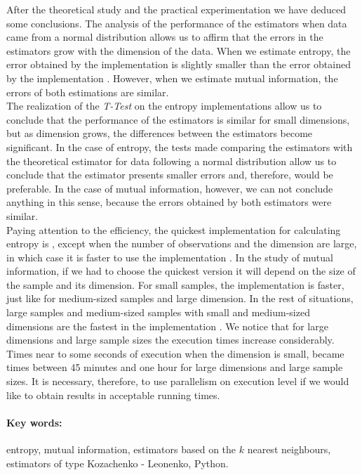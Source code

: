 After the theoretical study and the practical experimentation we have deduced some conclusions. The analysis of the performance of the estimators when data came from a normal distribution allows us to affirm that the errors in the estimators grow with the dimension of the data. When we estimate entropy, the error obtained by the implementation \cite{estimating} is slightly smaller than the error obtained by the implementation \cite{npeet}. However, when we estimate mutual information, the errors of both estimations are similar.\\

The realization of the \textit{T-Test} on the entropy implementations allow us to conclude that the performance of the estimators is similar for small dimensions, but as dimension grows, the differences between the estimators become significant. In the case of entropy, the tests made comparing the estimators with the theoretical estimator for data following a normal distribution allow us to conclude that the estimator \cite{estimating} presents smaller errors and, therefore, would be preferable. In the case of mutual information, however, we can not conclude anything in this sense, because the errors obtained by both estimators were similar.\\

Paying attention to the efficiency, the quickest implementation for calculating entropy is \cite{npeet}, except when the number of observations and the dimension are large, in which case it is faster to use the implementation \cite{estimating}. In the study of mutual information, if we had to choose the quickest version it will depend on the size of the sample and its dimension. For small samples, the implementation \cite{npeet} is faster, just like for medium-sized samples and large dimension. In the rest of situations, large samples and medium-sized samples with small and medium-sized dimensions are the fastest in the implementation \cite{estimating}. We notice that for large dimensions and large sample sizes the execution times increase considerably. Times near to some seconds of execution when the dimension is small, became times between 45 minutes and one hour for large dimensions and large sample sizes. It is necessary, therefore, to use parallelism on execution level if we would like to obtain results in acceptable running times.\\

\paragraph{Key words:} entropy, mutual information, estimators based on the $k$ nearest neighbours, estimators of type Kozachenko - Leonenko, Python.
